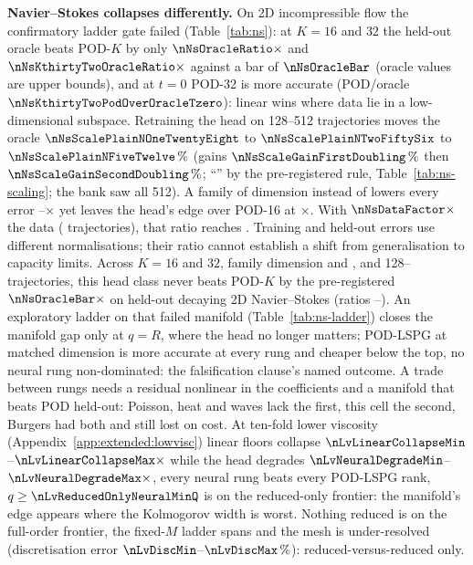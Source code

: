 \textbf{Navier--Stokes collapses differently.} On 2D
incompressible flow the confirmatory ladder gate failed (Table~\ref{tab:ns}): at $K=16$ and $32$ the
held-out oracle beats POD-$K$ by only $\nNsOracleRatio\times$ and
$\nNsKthirtyTwoOracleRatio\times$ against a bar of
$\nNsOracleBar$ (oracle values are upper bounds), and at $t=0$ POD-32 is more accurate (POD/oracle
$\nNsKthirtyTwoPodOverOracleTzero$): linear wins where data lie in a
low-dimensional subspace. Retraining the head on 128--512
trajectories moves the oracle
$\nNsScalePlainNOneTwentyEight$ to $\nNsScalePlainNTwoFiftySix$ to
$\nNsScalePlainNFiveTwelve\,\%$ (gains $\nNsScaleGainFirstDoubling\,\%$ then
$\nNsScaleGainSecondDoubling\,\%$; ``\nNsScalePlainVerdict''
by the pre-registered rule, Table~\ref{tab:ns-scaling}; the bank saw all
512). A family of dimension \nNsFamDimLow{} instead of
\nNsFamDimBase{} lowers every error \nNsFamDropMin--\nNsFamDropMax$\times$ yet
leaves the head's edge over POD-16 at \nNsFamOracleRatio$\times$.
With $\nNsDataFactor\times$ the data (\nNsDataTrainN{} trajectories),
that ratio reaches \nNsDataOracleRatio. Training and held-out errors
use different normalisations; their ratio cannot establish a shift
from generalisation to capacity limits. Across $K=16$ and $32$,
family dimension \nNsFamDimBase{} and \nNsFamDimLow, and
128--\nNsDataTrainN{} trajectories, this head class never beats POD-$K$
by the pre-registered $\nNsOracleBar\times$ on held-out decaying 2D
Navier--Stokes (ratios \nNsCellRatioMin--\nNsCellRatioMax). An exploratory ladder on that
failed manifold (Table~\ref{tab:ns-ladder}) closes the
manifold gap only at $q=R$, where the head no longer matters; POD-LSPG at
matched dimension is more accurate at every rung and cheaper below the
top, no neural rung non-dominated: the falsification clause's
named outcome. A trade between
rungs needs a residual nonlinear in the coefficients and a manifold that
beats POD held-out: Poisson, heat and waves lack the first, this cell the
second, Burgers had both and still lost on cost. At ten-fold lower viscosity
(Appendix~\ref{app:extended:lowvisc}) linear floors collapse
$\nLvLinearCollapseMin$--$\nLvLinearCollapseMax\times$ while the head degrades
$\nLvNeuralDegradeMin$--$\nLvNeuralDegradeMax\times$, every neural rung beats
every POD-LSPG rank, $q\ge\nLvReducedOnlyNeuralMinQ$ is on the
reduced-only frontier: the manifold's edge appears where the Kolmogorov
width is worst. Nothing reduced is on the full-order frontier,
the fixed-$M$ ladder spans \nLvLadderErrSpan{} and the mesh is
under-resolved (discretisation error $\nLvDiscMin$--$\nLvDiscMax\,\%$):
reduced-versus-reduced only.



